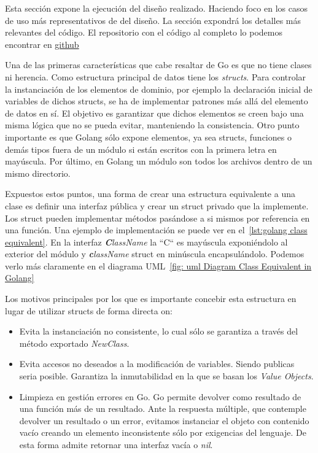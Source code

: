 Esta sección expone la ejecución del diseño realizado.
Haciendo foco en los casos de uso más representativos de del diseño.
La sección expondrá los detalles más relevantes del código.
El repositorio con el código al completo lo podemos encontrar en \href{https://github.com/Enrikerf/pfm}{github}

Una de las primeras características que cabe resaltar de Go es que no tiene clases ni herencia.
Como estructura principal de datos tiene los \textit{structs}.
Para controlar la instanciación de los elementos de dominio, por ejemplo la declaración inicial de variables de dichos structs, se ha de implementar patrones más allá del elemento de datos en sí.
El objetivo es garantizar que dichos elementos se creen bajo una misma lógica que no se pueda evitar, manteniendo la consistencia.
Otro punto importante es que Golang sólo expone elementos, ya sea structs, funciones o demás tipos fuera de un módulo si están escritos con la primera letra en mayúscula.
Por último, en Golang un módulo son todos los archivos dentro de un mismo directorio.

Expuestos estos puntos, una forma de crear una estructura equivalente a una clase es definir una interfaz pública y crear un struct privado que la implemente.
Los struct pueden implementar métodos pasándose a si mismos por referencia en una función.
Una ejemplo de implementación se puede ver en el~\cref{lst:golang class equivalent}.
En la interfaz \textit{\textbf{C}lassName} la “C“ es mayúscula exponiéndolo al exterior del módulo y \textit{\textbf{c}lassName} struct en minúscula encapsulándolo.
Podemos verlo más claramente en el diagrama UML~\cref{fig: uml Diagram Class Equivalent in Golang}

Los motivos principales por los que es importante concebir esta estructura en lugar de utilizar structs de forma directa on:

\begin{itemize}
    \item Evita la instanciación no consistente, lo cual sólo se garantiza a través del método exportado \textit{NewClass}.
    \item Evita accesos no deseados a la modificación de variables.
    Siendo publicas seria posible.
    Garantiza la inmutabilidad en la que se basan los \textit{Value Objects}.
    \item Limpieza en gestión errores en Go. Go permite devolver como resultado de una función más de un resultado.
    Ante la respuesta múltiple, que contemple devolver un resultado o un error, evitamos instanciar el objeto con contenido vacío creando un elemento inconsistente sólo por exigencias del lenguaje.
    De esta forma admite retornar una interfaz vacía o \textit{nil}.
\end{itemize}

